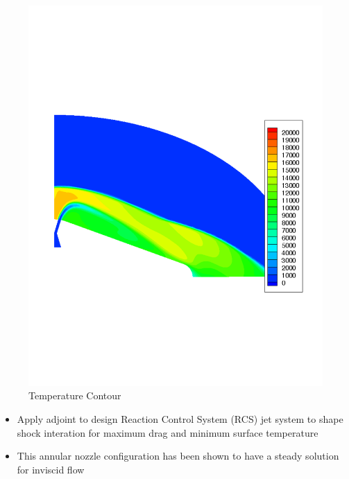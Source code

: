 \documentclass{beamer}
\begin{document}
\begin{frame}
\begin{figure}[ht]
\begin{minipage}[b]{0.4\linewidth}
         \includegraphics[scale=0.2,trim={0 8cm 0 9cm}]{figures/from_peter/T_annular}
         \caption{Temperature Contour}
         \label{fig:b}
     \end{minipage}
  \end{figure}
  \begin{itemize}
    \item Apply adjoint to design Reaction Control System (RCS) jet system to
      shape shock interation for maximum drag and minimum surface temperature
    \item This annular nozzle configuration has been shown to have a steady
      solution for inviscid flow
  \end{itemize}
\end{frame}
\end{document}
